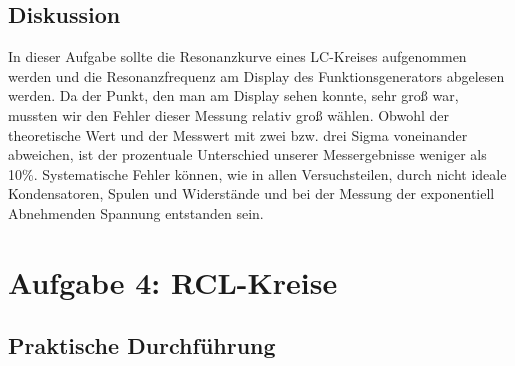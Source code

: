 \documentclass[12pt]{scrartcl}
\begin{document}
\subsection{Diskussion}
In dieser Aufgabe sollte die Resonanzkurve eines LC-Kreises aufgenommen werden und die Resonanzfrequenz am Display des Funktionsgenerators abgelesen werden. Da der Punkt, den man am Display sehen konnte, sehr groß war, mussten wir den Fehler dieser Messung relativ groß wählen. Obwohl der theoretische Wert und der Messwert mit zwei bzw. drei Sigma voneinander abweichen, ist der prozentuale Unterschied unserer Messergebnisse weniger als 10\%. Systematische Fehler können, wie in allen Versuchsteilen, durch nicht ideale Kondensatoren, Spulen und Widerstände und bei der Messung der exponentiell Abnehmenden Spannung entstanden sein. 
\section{Aufgabe 4: RCL-Kreise}
\subsection{Praktische Durchführung}
\end{document}
